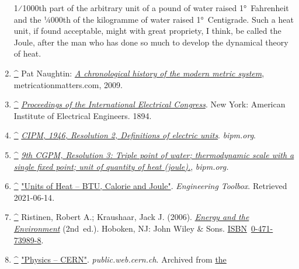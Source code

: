 \documentclass[
]{article}
\newenvironment{LTR}{\beginL}{\endL}
\begin{document}
\begin{LTR}
\begin{otherlanguage}{english}
\begin{enumerate}
  {{1}⁄{1000}}th part of the arbitrary unit of a pound of water raised
  1°~Fahrenheit and the {{1}⁄{4000}}th of the kilogramme of water raised
  1°~Centigrade. Such a heat unit, if found acceptable, might with great
  propriety, I think, be called the Joule, after the man who has done so
  much to develop the dynamical theory of heat.{}
\item
  \label{cite_note-6}{{\textbf{\hyperref[cite_ref-6]{\^{}}}}
  {Pat Naughtin:
  \href{http://www.metricationmatters.com/docs/MetricationTimeline.pdf}{\emph{A
  chronological history of the modern metric system}},
  metricationmatters.com, 2009.}}
\item
  \label{cite_note-7}{{\textbf{\hyperref[cite_ref-7]{\^{}}}}
  {\href{https://archive.org/details/proceedingsinte01chicgoog}{\emph{Proceedings
  of the International Electrical Congress}}. New York: American
  Institute of Electrical Engineers. 1894.{}}}
\item
  \label{cite_note-8}{{\textbf{\hyperref[cite_ref-8]{\^{}}}}
  {\href{http://www.bipm.org/en/CIPM/db/1946/2/}{\emph{CIPM, 1946,
  Resolution 2, Definitions of electric units}}. \emph{bipm.org}.}}
\item
  \label{cite_note-9}{{\textbf{\hyperref[cite_ref-9]{\^{}}}}
  {\href{http://www.bipm.org/en/CGPM/db/9/3/}{\emph{9th CGPM, Resolution
  3: Triple point of water; thermodynamic scale with a single fixed
  point; unit of quantity of heat (joule).}}, \emph{bipm.org.}}}
\item
  \label{cite_note-10}{{\textbf{\hyperref[cite_ref-10]{\^{}}}}
  {\href{http://www.engineeringtoolbox.com/heat-units-d_664.html}{"Units
  of Heat -- BTU, Calorie and Joule"}. \emph{Engineering Toolbox}{.
  Retrieved {2021-06-14}}.{}}}
\item
  \label{cite_note-12}{{\textbf{\hyperref[cite_ref-12]{\^{}}}}
  {Ristinen, Robert A.; Kraushaar, Jack J. (2006).
  {\href{https://archive.org/details/energyenvironmen00rist}{\emph{Energy
  and the Environment}}} (2nd~ed.). Hoboken, NJ: John Wiley \& Sons.
  \href{/wiki/ISBN_(identifier)}{ISBN}~\href{/wiki/Special:BookSources/0-471-73989-8}{0-471-73989-8}.{}}}
\item
  \label{cite_note-13}{{\textbf{\hyperref[cite_ref-13]{\^{}}}}
  {\href{https://web.archive.org/web/20121213173112/https://public.web.cern.ch/public/en/Science/Glossary-en.php}{"Physics
  -- CERN"}. \emph{public.web.cern.ch}. Archived from
  \href{http://public.web.cern.ch/Public/en/Science/Glossary-en.php}{the
}}}
\end{enumerate}
\end{otherlanguage}
\end{LTR}
\end{document}
